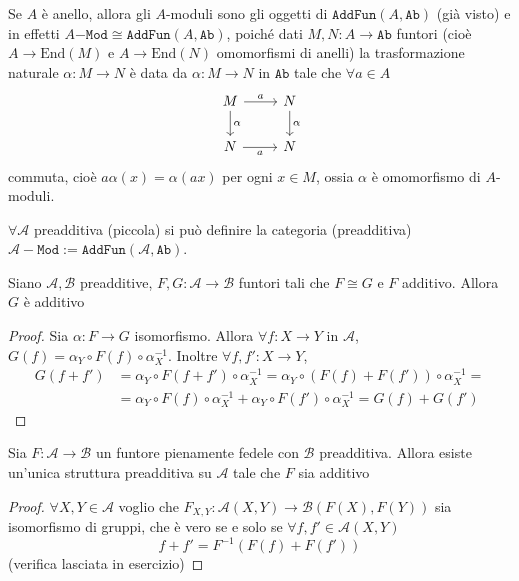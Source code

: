 \begin{example}{}
    Se \(A\) è anello, allora gli \(A\)-moduli sono gli oggetti di \(\mathtt{AddFun}{(A, \mathtt{Ab})}\) (già visto)
    e in effetti \(A\mathtt{-Mod} \cong \mathtt{AddFun}{(A, \mathtt{Ab})}\),
    poiché dati \(M, N : A \to \mathtt{Ab}\) funtori (cioè \(A \to \mathrm{End}{(M)}\) e \(A \to \mathrm{End}{(N)}\) omomorfismi di anelli) la trasformazione naturale \(\alpha : M \to N\) è data da
    \(\alpha : M \to N\) in \(\mathtt{Ab}\) tale che \(\forall a \in A\) 
\[\begin{tikzcd}
	{M} & {N} \\
	{N} & {N}
	\arrow["{a}", from=1-1, to=1-2]
	\arrow["{\alpha}", from=1-1, to=2-1]
	\arrow["{\alpha}", from=1-2, to=2-2]
	\arrow["{a}"', from=2-1, to=2-2]
\end{tikzcd}\]
commuta, cioè \(a \alpha {(x)} = \alpha {(a x)}\) per ogni \(x \in M\), ossia \(
\alpha \) è omomorfismo di \(A\)-moduli.
\end{example}
\begin{remark}{}
    \(\forall \mathcal{A}\) preadditiva (piccola) si può definire la categoria
    (preadditiva) \(\mathcal{A-}\mathtt{Mod} := \mathtt{AddFun}{(\mathcal{A}, \mathtt{Ab})}\).
\end{remark}
\begin{proposition}{}
    Siano \(\mathcal{A}, \mathcal{B}\) preadditive, \(F, G : \mathcal{A} \to
    \mathcal{B}\) funtori tali che \(F \cong G\) e \(F\) additivo. Allora \(G\)
    è additivo
\end{proposition}
\begin{proof}{}
    Sia \(\alpha : F \to G\) isomorfismo. Allora \(\forall  f : X \to Y\) in \(\mathcal{A}\), 
    \(G{(f)} = \alpha_Y \circ F{(f)} \circ \alpha_X^{-1}\).
    Inoltre \(\forall f, f' : X \to Y\),
    \begin{align*}G{(f + f')} &= \alpha_Y \circ F{(f +
    f')} \circ \alpha_X^{-1} = \alpha_Y \circ {(F{(f)} + F{(f')})} \circ \alpha_X^{-1} = \\
    &= \alpha_Y \circ F{(f)} \circ \alpha_X^{-1} + \alpha_Y \circ F{(f')} \circ
    \alpha_X^{-1} = G{(f)} + G{(f')}
\end{align*}
\end{proof}

\begin{remark}{}
    Sia \(F : \mathcal{A} \to \mathcal{B}\) un funtore pienamente fedele con \(\mathcal{B}\) preadditiva.
    Allora esiste un'unica struttura preadditiva su \(\mathcal{A}\) tale che \(F\) 
    sia additivo
\end{remark}
\begin{proof}{}
    \(\forall X, Y \in \mathcal{A}\) voglio che \(F_{X,Y}  : \mathcal{A}{(X, Y)} \to \mathcal{B}{(F{(X)}, F{(Y)})}\) sia isomorfismo di gruppi, che è vero se e solo se \(\forall f, f' \in \mathcal{A}{(X,Y)}\) 
    \[
      f + f' = F^{-1}{(F{(f)} + F{(f')})} 
    \]
    (verifica lasciata in esercizio) %
\end{proof}

